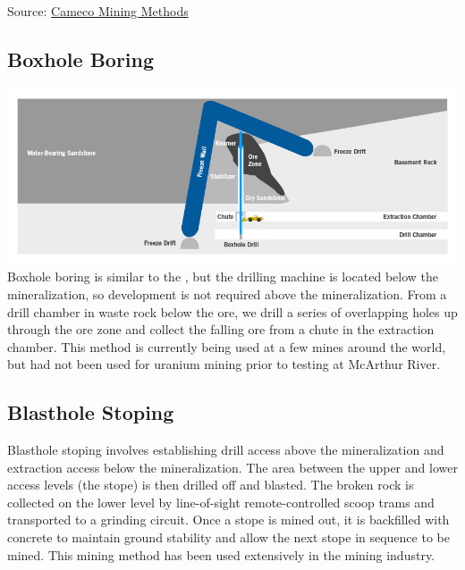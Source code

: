 Source: \href{https://www.cameco.com/businesses/mining-methods}{Cameco Mining Methods}

\subsection*{Boxhole Boring}
\includegraphics{img/cameco/3.0.1-1MiningMethods-Boxhole.jpg}
Boxhole boring is similar to the , but the drilling machine is located below the mineralization, so development is not required above the mineralization. From a drill chamber in waste rock below the ore, we drill a series of overlapping holes up through the ore zone and collect the falling ore from a chute in the extraction chamber. This method is currently being used at a few mines around the world, but had not been used for uranium mining prior to testing at McArthur River.
\subsection*{Blasthole Stoping}


Blasthole stoping involves establishing drill access above the mineralization and extraction access below the mineralization. The area between the upper and lower access levels (the stope) is then drilled off and blasted. The broken rock is collected on the lower level by line-of-sight remote-controlled scoop trams and transported to a grinding circuit. Once a stope is mined out, it is backfilled with concrete to maintain ground stability and allow the next stope in sequence to be mined. This mining method has been used extensively in the mining industry.
